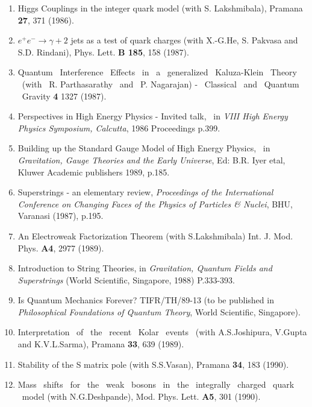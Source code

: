 \begin{enumerate}
\item Higgs Couplings in the integer quark model (with S. Lakshmibala),
Pramana {\bf 27}, 371 (1986).

\item $e^+e^- \rightarrow \gamma + 2$ jets as a test of quark charges
(with X.-G.He, S. Pakvasa and S.D. Rindani), Phys. Lett. {\bf B 185},
158 (1987).

\item Quantum \ Interference \ Effects \ in \ a \ generalized \ Kaluza-Klein \
Theory
\ (with \ R. Parthasarathy \ and \ P. Nagarajan) - \ Classical \ and \ Quantum \ Gravity
{\bf 4} 1327 (1987).

\item Perspectives in High Energy Physics - Invited talk, \ in {\it VIII High
Energy Physics Symposium, Calcutta}, 1986 Proceedings p.399.

\item Building up the Standard Gauge Model of High Energy Physics, \ in
{\it Gravitation, Gauge Theories and the Early Universe}, Ed: B.R. Iyer etal,
Kluwer Academic publishers 1989, p.185.

\item Superstrings - an elementary review, {\it Proceedings of the
International Conference on Changing Faces of the Physics of Particles \&
Nuclei}, BHU, Varanasi (1987), p.195.

\item An Electroweak Factorization Theorem (with S.Lakshmibala)
Int. J. Mod. Phys. {\bf A4}, 2977 (1989).

\item Introduction to String Theories, in {\it Gravitation, Quantum
Fields and Superstrings} (World Scientific, Singapore, 1988) P.333-393.

\item Is Quantum Mechanics Forever? TIFR/TH/89-13 (to be published
in {\it Philosophical Foundations of Quantum Theory}, World Scientific,
Singapore).

\item Interpretation \ of \ the \ recent \ Kolar \ events \ (with
A.S.Joshipura, V.Gupta and K.V.L.Sarma), Pramana {\bf 33}, 639 (1989).

\item Stability of the S matrix pole (with S.S.Vasan), Pramana {\bf
34}, 183 (1990).

\item Mass \ shifts \ for \ the \ weak \ bosons \ in \ the \ integrally \
charged
\ quark \ model (with N.G.Deshpande), Mod. Phys. Lett. {\bf A5}, 301 (1990).


\end{enumerate}
